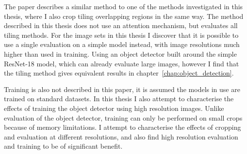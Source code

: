 The paper describes a similar method to one of the methods investigated in this thesis, where I also crop tiling overlapping regions in the same way. The method described in this thesis does not use an attention mechanism, but evaluates all tiling methods. For the image sets in this thesis I discover that it is possible to use a single evaluation on a simple model instead, with image resolutions much higher than used in training. Using an object detector built around the simple ResNet-18 model, which can already evaluate large images, however I find that the tiling method gives equivalent results in chapter~\ref{chap:object_detection}.
 
Training is also not described in this paper, it is assumed the models in use are trained on standard datasets. In this thesis I also attempt to characterise the effects of training the object detector using high resolution images. Unlike evaluation of the object detector, training can only be performed on small crops because of memory limitations. I attempt to characterise the effects of cropping and evaluation at different resolutions, and also find high resolution evaluation and training to be of significant benefit.
